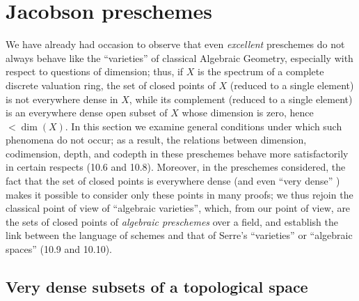 \section{Jacobson preschemes}
\label{section:IV.10}

We have already had occasion to observe  that even
\emph{excellent} preschemes  do not always behave like the
``varieties'' of classical Algebraic Geometry, especially with respect to
questions of dimension; thus, if $X$ is the spectrum of a complete discrete
valuation ring, the set of closed points of $X$ (reduced to a single element)
is not everywhere dense in $X$, while its complement (reduced to a single
element) is an everywhere dense open subset of $X$ whose dimension is zero,
hence $<\dim(X)$. In this section we examine general conditions under which
such phenomena do not occur; as a result, the relations between dimension,
codimension, depth, and codepth in these preschemes behave more satisfactorily
in certain respects (10.6 and 10.8). Moreover, in the preschemes considered,
the fact that the set of closed points is everywhere dense (and even ``very
dense'' ) makes it possible to consider only these points in
many proofs; we thus rejoin the classical point of view of ``algebraic
varieties'', which, from our point of view, are the sets of closed points of
\emph{algebraic preschemes} over a field, and establish the link between the
language of schemes and that of Serre's ``varieties'' or ``algebraic spaces''
(10.9 and 10.10).

\subsection{Very dense subsets of a topological space}
\label{subsection:IV.10.1}

